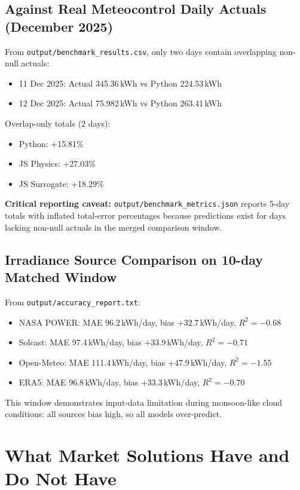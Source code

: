 \documentclass[11pt,a4paper]{article}
\newcommand{\artifact}[1]{\texttt{#1}}
\begin{document}
\subsection{Against Real Meteocontrol Daily Actuals (December 2025)}

From \artifact{output/benchmark\_results.csv}, only two days contain overlapping non-null actuals:
\begin{itemize}
  \item 11 Dec 2025: Actual 345.36\,kWh vs Python 224.53\,kWh
  \item 12 Dec 2025: Actual 75.982\,kWh vs Python 263.41\,kWh
\end{itemize}

Overlap-only totals (2 days):
\begin{itemize}
  \item Python: +15.81\%
  \item JS Physics: +27.03\%
  \item JS Surrogate: +18.29\%
\end{itemize}

\textbf{Critical reporting caveat:}
\artifact{output/benchmark\_metrics.json} reports 5-day totals with inflated total-error percentages because
predictions exist for days lacking non-null actuals in the merged comparison window.

\subsection{Irradiance Source Comparison on 10-day Matched Window}

From \artifact{output/accuracy\_report.txt}:
\begin{itemize}
  \item NASA POWER: MAE 96.2\,kWh/day, bias +32.7\,kWh/day, $R^2=-0.68$
  \item Solcast: MAE 97.4\,kWh/day, bias +33.9\,kWh/day, $R^2=-0.71$
  \item Open-Meteo: MAE 111.4\,kWh/day, bias +47.9\,kWh/day, $R^2=-1.55$
  \item ERA5: MAE 96.8\,kWh/day, bias +33.3\,kWh/day, $R^2=-0.70$
\end{itemize}

This window demonstrates input-data limitation during monsoon-like cloud conditions:
all sources bias high, so all models over-predict.

\section{What Market Solutions Have and Do Not Have}
\end{document}
